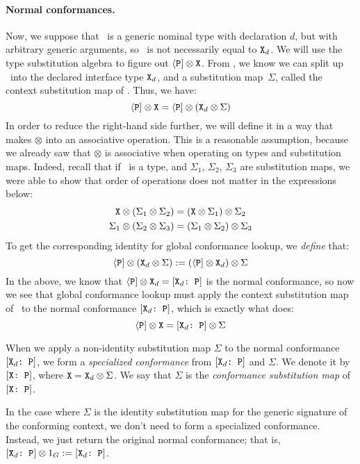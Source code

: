 \documentclass[../generics]{subfiles}
\begin{document}
\paragraph{Normal conformances.} Now, we suppose that \tX\ is a generic nominal type with declaration $d$, but with arbitrary generic arguments, so \tX\ is not necessarily equal to $\texttt{X}_d$. We will use the type substitution algebra to figure out $\langle\texttt{P}] \otimes \texttt{X}$. From , we know we can split up \tX\ into the declared interface type $\texttt{X}_d$, and a substitution map~$\Sigma$, called the context substitution map of \tX. Thus, we have:
\[
\langle\texttt{P}] \otimes \texttt{X} = \langle\texttt{P}] \otimes (\texttt{X}_d \otimes \Sigma)
\]
In order to reduce the right-hand side further, we will define it in a way that makes $\otimes$ into an associative operation. This is a reasonable assumption, because we already saw that $\otimes$ is associative when operating on types and substitution maps. Indeed, recall that if \tX\ is a type, and $\Sigma_1$, $\Sigma_2$, $\Sigma_3$ are substitution maps, we were able to show that order of operations does not matter in the expressions below:
\begin{gather*}
\texttt{X}\otimes(\Sigma_1\otimes\Sigma_2)=(\texttt{X}\otimes\Sigma_1)\otimes\Sigma_2\\
\Sigma_1\otimes(\Sigma_2\otimes\Sigma_3)=(\Sigma_1\otimes\Sigma_2)\otimes\Sigma_3
\end{gather*}
To get the corresponding identity for global conformance lookup, we \emph{define} that:
\[
\langle\texttt{P}] \otimes (\texttt{X}_d \otimes \Sigma) := (\langle\texttt{P}] \otimes \texttt{X}_d) \otimes \Sigma
\]
In the above, we know that $\langle\texttt{P}] \otimes \texttt{X}_d=[\texttt{$\texttt{X}_d$:~P}]$ is the normal conformance, so now we see that global conformance lookup must apply the context substitution map of \tX\ to the normal conformance $[\texttt{$\texttt{X}_d$:~P}]$, which is exactly what  does:
\[
\langle\texttt{P}] \otimes \texttt{X} = [\texttt{$\texttt{X}_d$:~P}] \otimes \Sigma
\]

When we apply a non-identity substitution map $\Sigma$ to the normal conformance $[\texttt{$\texttt{X}_d$:~P}]$, we form a \emph{specialized conformance} from $[\texttt{$\texttt{X}_d$:~P}]$ and $\Sigma$. We denote it by $[\texttt{X:~P}]$, where $\texttt{X}=\texttt{X}_d\otimes\Sigma$. We say that $\Sigma$ is the \emph{conformance substitution map} of $[\texttt{X:~P}]$.

In the case where $\Sigma$ is the identity substitution map for the generic signature of the conforming context, we don't need to form a specialized conformance. Instead, we just return the original normal conformance; that is, $[\texttt{$\texttt{X}_d$:~P}] \otimes 1_G := [\texttt{$\texttt{X}_d$:~P}]$.
\end{document}
